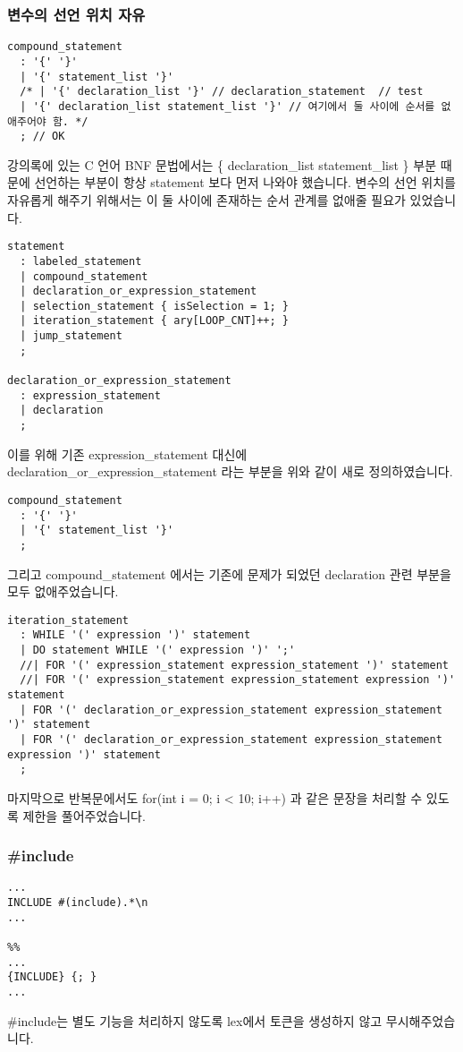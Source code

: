 \documentclass{article}
\begin{document}
\subsubsection{변수의 선언 위치 자유}
\begin{verbatim}
compound_statement
  : '{' '}'
  | '{' statement_list '}'
  /* | '{' declaration_list '}' // declaration_statement  // test
  | '{' declaration_list statement_list '}' // 여기에서 둘 사이에 순서를 없애주어야 함. */
  ; // OK
\end{verbatim}
강의록에 있는 C 언어 BNF 문법에서는 \{ declaration\_list statement\_list \} 부분 때문에 선언하는 부분이 항상 statement 보다 먼저 나와야 했습니다.
변수의 선언 위치를 자유롭게 해주기 위해서는 이 둘 사이에 존재하는 순서 관계를 없애줄 필요가 있었습니다.
\begin{verbatim}
statement
  : labeled_statement
  | compound_statement
  | declaration_or_expression_statement
  | selection_statement { isSelection = 1; }
  | iteration_statement { ary[LOOP_CNT]++; }
  | jump_statement
  ;

declaration_or_expression_statement
  : expression_statement
  | declaration
  ;
\end{verbatim}
이를 위해 기존 expression\_statement 대신에 declaration\_or\_expression\_statement 라는 부분을 위와 같이 새로 정의하였습니다.
\begin{verbatim}
compound_statement
  : '{' '}'
  | '{' statement_list '}'
  ;
\end{verbatim}
그리고 compound\_statement 에서는 기존에 문제가 되었던 declaration 관련 부분을 모두 없애주었습니다.
\begin{verbatim}
iteration_statement
  : WHILE '(' expression ')' statement
  | DO statement WHILE '(' expression ')' ';'
  //| FOR '(' expression_statement expression_statement ')' statement
  //| FOR '(' expression_statement expression_statement expression ')' statement
  | FOR '(' declaration_or_expression_statement expression_statement ')' statement
  | FOR '(' declaration_or_expression_statement expression_statement expression ')' statement
  ;
\end{verbatim}
마지막으로 반복문에서도 for(int i = 0; i < 10; i++) 과 같은 문장을 처리할 수 있도록 제한을 풀어주었습니다.
\subsubsection{\#include}
\begin{verbatim}
...
INCLUDE #(include).*\n
...

%%
...
{INCLUDE} {; }
...
\end{verbatim}
\quad\#include는 별도 기능을 처리하지 않도록 lex에서 토큰을 생성하지 않고 무시해주었습니다.
\end{document}
